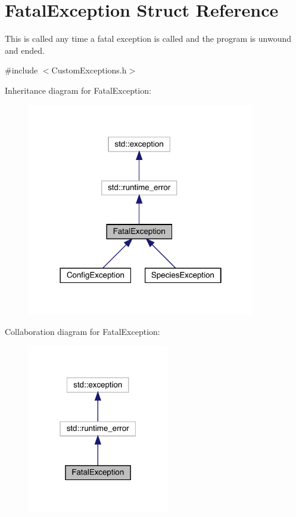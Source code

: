 \hypertarget{struct_fatal_exception}{}\section{Fatal\+Exception Struct Reference}
\label{struct_fatal_exception}


This is called any time a fatal exception is called and the program is unwound and ended.  




{\ttfamily \#include $<$Custom\+Exceptions.\+h$>$}



Inheritance diagram for Fatal\+Exception\+:\nopagebreak
\begin{figure}[H]
\begin{center}
\leavevmode
\includegraphics[width=282pt]{struct_fatal_exception__inherit__graph}
\end{center}
\end{figure}


Collaboration diagram for Fatal\+Exception\+:\nopagebreak
\begin{figure}[H]
\begin{center}
\leavevmode
\includegraphics[width=175pt]{struct_fatal_exception__coll__graph}
\end{center}
\end{figure}
